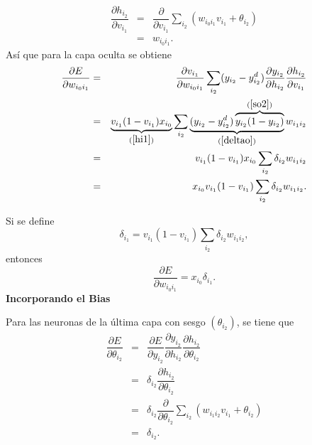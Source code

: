 \documentclass[11pt,letterpaper]{article}
\theoremstyle{definition}
\theoremstyle{definition}
\theoremstyle{definition}
\theoremstyle{definition}
\theoremstyle{definition}
\theoremstyle{definition}
\theoremstyle{definition}
\theoremstyle{definition}
\begin{document}
\begin{equation}
	\begin{array}{lll}
		\dfrac{\partial h_{i_2}}{\partial v_{i_1}} &=&  \dfrac{\partial }{\partial v_{i_1}} \displaystyle\sum_{i_2} \left(w_{i_0 i_1} v_{i_1} + \theta_{i_2}\right)\\
		&=& w_{i_0 i_1}.
	\end{array}
\end{equation}
Así que para la capa oculta se obtiene
\begin{eqnarray*}
	\dfrac{\partial E}{\partial w_{i_0 i_1}}&=&\dfrac{\partial v_{i_1}}{\partial w_{i_0 i_1}}\displaystyle\sum_{i_2} (y_{i_2}-y_{i_2}^d) \dfrac{\partial y_{i_2}}{\partial h_{i_2}}\dfrac{\partial h_{i_2}}{\partial v_{i_1}}\\
	&=&\underbrace{v_{i_1} (1-v_{i_1}) x_{i_0}}_{(\ref{hi1})} \displaystyle\sum_{i_2} \underbrace{(y_{i_2}-y_{i_2}^d) \overbrace{y_{i_2} (1-y_{i_2})}^{(\ref{so2})}}_{(\ref{deltao})} w_{i_1 i_2}\\
	&=&v_{i_1}(1-v_{i_1}) x_{i_0} \displaystyle\sum_{i_2} \delta_{i_2} w_{i_1 i_2}\\
	&=&x_{i_0} v_{i_1} (1-v_{i_1})\displaystyle\sum_{i_2} \delta_{i_2}w_{i_1 i_2}.
\end{eqnarray*}

Si se define 
\[ \delta_{i_1} = v_{i_1} (1-v_{i_1})  \displaystyle\sum_{i_2} \delta_{i_2} w_{i_1 i_2}, \]
entonces 
\[ \dfrac{\partial E}{\partial w_{i_0 i_1}} = x_{i_0} \delta_{i_1}. \]
\textbf{Incorporando el Bias}

Para las neuronas de la última capa con sesgo $ (\theta_{i_2}) $, se tiene que 
\begin{eqnarray*}
	\dfrac{\partial E}{\partial \theta_{i_2}}&=&\dfrac{\partial E}{\partial y_{i_2}}\dfrac{\partial y_{i_2}}{\partial h_{i_2}}\dfrac{\partial h_{i_2}}{\partial \theta_{i_2}}\\
	&=& \delta_{i_2} \dfrac{\partial h_{i_2}}{\partial \theta_{i_2}}\\
	&=& \delta_{i_2}\dfrac{\partial}{\partial \theta_{i_2}}\sum_{i_2}\left( w_{i_1 i_2} v_{i_1} + \theta_{i_2}\right)\\
	&=& \delta_{i_2}.
\end{eqnarray*}
\end{document}
